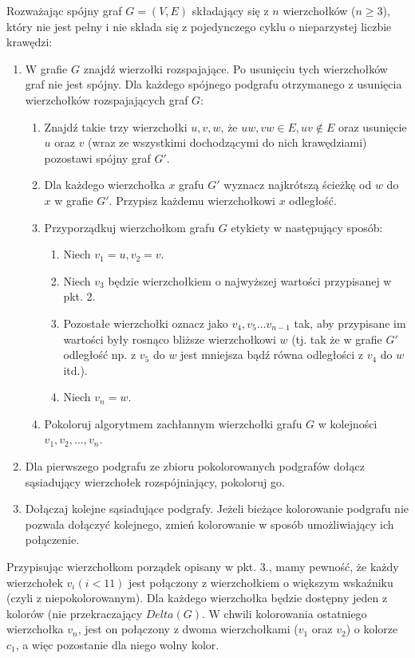 \documentclass[a4paper]{article}
\begin{document}
	Rozważając spójny graf $G = (V, E)$ składający się z $n$ wierzchołków ($n \geq 3$), który nie jest pełny i nie składa się z pojedynczego cyklu o nieparzystej liczbie krawędzi:

	\begin{enumerate}
		\item W grafie $G$ znajdź wierzołki rozspajające. Po usunięciu tych wierzchołków graf nie jest spójny. Dla każdego spójnego podgrafu otrzymanego z usunięcia wierzchołków rozspajających graf $G$:
		\begin{enumerate}
			\item Znajdź takie trzy wierzchołki $u, v, w$, że $uw, vw \in E, uv \notin E$ oraz usunięcie $u$ oraz $v$ (wraz ze wszystkimi dochodzącymi do nich krawędziami) pozostawi spójny graf $G'$.
			\item Dla każdego wierzchołka $x$ grafu $G'$ wyznacz najkrótszą ścieżkę od $w$ do $x$ w grafie $G'$. Przypisz każdemu wierzchołkowi $x$ odległość. 
			\item Przyporządkuj wierzchołkom grafu $G$ etykiety w następujący sposób:
				\begin{enumerate}
					\item Niech $v_1 = u, v_2 = v$.
					\item Niech $v_3$ będzie wierzchołkiem o najwyższej wartości przypisanej w pkt. 2.
					\item Pozostałe wierzchołki oznacz jako $v_4, v_5 \ldots v_{n-1}$ tak, aby przypisane im wartości były rosnąco bliższe wierzchołkowi $w$ (tj. tak że w grafie $G'$ odległość np. z $v_5$ do $w$ jest mniejsza bądź równa odległości z $v_4$ do $w$ itd.).
					\item Niech $v_n = w$.
				\end{enumerate}
			\item Pokoloruj algorytmem zachłannym wierzchołki grafu $G$ w kolejności $v_1, v_2, ..., v_n$.
		\end{enumerate}
		\item Dla pierwszego podgrafu ze zbioru pokolorowanych podgrafów dołącz sąsiadujący wierzchołek rozspójniający, pokoloruj go.
		\item Dołączaj kolejne sąsiadujące podgrafy. Jeżeli bieżące kolorowanie podgrafu nie pozwala dołączyć kolejnego, zmień kolorowanie w sposób umożliwiający ich połączenie.
	\end{enumerate}

	Przypisując wierzchołkom porządek opisany w pkt. 3., mamy pewność, że każdy wierzchołek $v_i (i < 11)$ jest połączony z wierzchołkiem o większym wskaźniku (czyli z niepokolorowanym). Dla każdego wierzchołka będzie dostępny jeden z kolorów (nie przekraczający $Delta(G)$. W chwili kolorowania ostatniego wierzchołka $v_n$, jest on połączony z dwoma wierzchołkami ($v_1$ oraz $v_2$) o kolorze $c_1$, a więc pozostanie dla niego wolny kolor. 	
\end{document}
